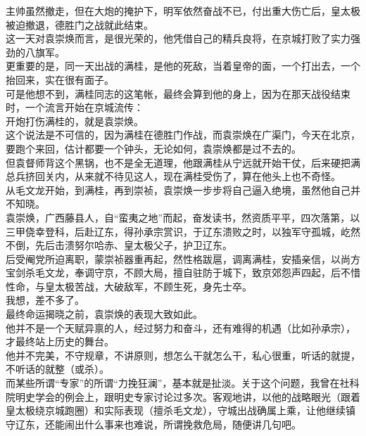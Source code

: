 \begin{multicols}{\theparacolNo}
主帅虽然撤走，但在大炮的掩护下，明军依然奋战不已，付出重大伤亡后，皇太极被迫撤退，德胜门之战就此结束。\\

这一天对袁崇焕而言，是很光荣的，他凭借自己的精兵良将，在京城打败了实力强劲的八旗军。\\

更重要的是，同一天出战的满桂，是他的死敌，当着皇帝的面，一个打出去，一个抬回来，实在很有面子。\\

可是他想不到，满桂同志的这笔帐，最终会算到他的身上，因为在那天战役结束时，一个流言开始在京城流传：\\

开炮打伤满桂的，就是袁崇焕。\\

这个说法是不可信的，因为满桂在德胜门作战，而袁崇焕在广渠门，今天在北京，要跑个来回，估计都要一个钟头，无论如何，袁崇焕都是过不去的。\\

但袁督师背这个黑锅，也不是全无道理，他跟满桂从宁远就开始干仗，后来硬把满总兵挤回关内，从来就不待见这人，现在满桂受伤了，算在他头上也不奇怪。\\

从毛文龙开始，到满桂，再到崇祯，袁崇焕一步步将自己逼入绝境，虽然他自己并不知晓。\\

袁崇焕，广西藤县人，自“蛮夷之地”而起，奋发读书，然资质平平，四次落第，以三甲侥幸登科，后赴辽东，得孙承宗赏识，于辽东溃败之时，以独军守孤城，屹然不倒，先后击溃努尔哈赤、皇太极父子，护卫辽东。\\

后受阉党所迫离职，蒙崇祯器重再起，然性格跋扈，调离满桂，安插亲信，以尚方宝剑杀毛文龙，奉调守京，不顾大局，擅自驻防于城下，致京郊怨声四起，后不惜性命，与皇太极苦战，大破敌军，不顾生死，身先士卒。\\

我想，差不多了。\\

最终命运揭晓之前，袁崇焕的表现大致如此。\\

他并不是一个天赋异禀的人，经过努力和奋斗，还有难得的机遇（比如孙承宗），才最终站上历史的舞台。\\

他并不完美，不守规章，不讲原则，想怎么干就怎么干，私心很重，听话的就提，不听话的就整（或杀）。\\

而某些所谓“专家”的所谓“力挽狂澜”，基本就是扯淡。关于这个问题，我曾在社科院明史学会的例会上，跟明史专家讨论过多次。客观地讲，以他的战略眼光（跟着皇太极绕京城跑圈）和实际表现（擅杀毛文龙），守城出战确属上乘，让他继续镇守辽东，还能闹出什么事来也难说，所谓挽救危局，随便讲几句吧。\\


\end{multicols}
